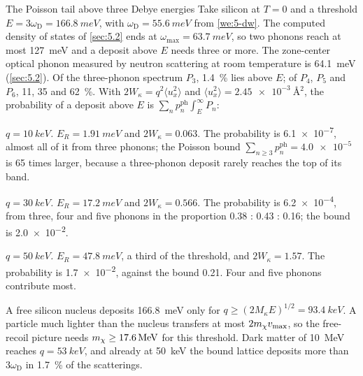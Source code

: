 \begin{workedexample}{The Poisson tail above three Debye energies}\label{we:11-tail}
Take silicon at $T = 0$ and a threshold $E = 3\omega_{\mathrm{D}} = \SI{166.8}{meV}$, with $\omega_{\mathrm{D}} = \SI{55.6}{meV}$ from \cref{we:5-dw}. The computed density of states of \cref{sec:5.2} ends at $\omega_{\mathrm{max}} = \SI{63.7}{meV}$, so two phonons reach at most \SI{127}{meV} and a deposit above $E$ needs three or more. The zone-center optical phonon measured by neutron scattering at room temperature is \SI{64.1}{meV} (\cref{sec:5.2}). Of the three-phonon spectrum $P_3$, \SI{1.4}{\percent} lies above $E$; of $P_4$, $P_5$ and $P_6$, 11, 35 and \SI{62}{\percent}. With $2W_\kappa = q^2\langle u_x^2\rangle$ and $\langle u_x^2\rangle = \SI{2.45e-3}{\angstrom^2}$, the probability of a deposit above $E$ is $\sum_np^{\mathrm{ph}}_n\int_E^\infty P_n$:

\emph{$q = \SI{10}{keV}$.} $E_R = \SI{1.91}{meV}$ and $2W_\kappa = 0.063$. The probability is \num{6.1e-7}, almost all of it from three phonons; the Poisson bound $\sum_{n\ge3}p^{\mathrm{ph}}_n = \num{4.0e-5}$ is 65 times larger, because a three-phonon deposit rarely reaches the top of its band.

\emph{$q = \SI{30}{keV}$.} $E_R = \SI{17.2}{meV}$ and $2W_\kappa = 0.566$. The probability is \num{6.2e-4}, from three, four and five phonons in the proportion 0.38 : 0.43 : 0.16; the bound is \num{2.0e-2}.

\emph{$q = \SI{50}{keV}$.} $E_R = \SI{47.8}{meV}$, a third of the threshold, and $2W_\kappa = 1.57$. The probability is \num{1.7e-2}, against the bound 0.21. Four and five phonons contribute most.

A free silicon nucleus deposits \SI{166.8}{meV} only for $q \ge (2M_\kappa E)^{1/2} = \SI{93.4}{keV}$. A particle much lighter than the nucleus transfers at most $2m_{\chi} v_{\mathrm{max}}$, so the free-recoil picture needs $m_{\chi} \ge \SI{17.6}{MeV}$ for this threshold. Dark matter of \SI{10}{MeV} reaches $q = \SI{53}{keV}$, and already at \SI{50}{keV} the bound lattice deposits more than $3\omega_{\mathrm{D}}$ in \SI{1.7}{\percent} of the scatterings.
\end{workedexample}

